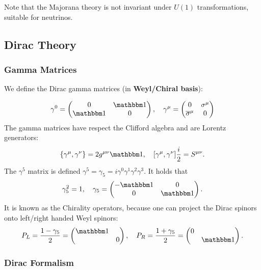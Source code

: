 \documentclass{article}
\begin{document}
Note that the Majorana theory is not invariant under $U(1)$ transformations, suitable for neutrinos.
\subsection{Dirac Theory}

\subsubsection{Gamma Matrices}

We define the Dirac gamma matrices (in \textbf{Weyl/Chiral basis}):

$$\gamma^0=\begin{pmatrix}0&\mathbbm 1\\\mathbbm 1&0\end{pmatrix},\quad\gamma^\mu=\begin{pmatrix}0&\sigma^\mu\\\overline\sigma^\mu&0\end{pmatrix}$$
The gamma matrices have respect the Clifford algebra and are Lorentz generators:
$$\acomm{\gamma^\mu}{\gamma^\nu}=2g^{\mu\nu}\mathbbm 1,\quad\comm{\gamma^\mu}{\gamma^\nu}\frac i2=S^{\mu\nu}.$$
The $\gamma^5$ matrix is defined $\gamma^5=\gamma_5=i\gamma^0\gamma^1\gamma^2\gamma^3$. It holds that 
\begin{equation}
    \gamma_5^2=1,\quad\gamma_5=\begin{pmatrix}-\mathbbm 1&0\\0&\mathbbm 1\end{pmatrix}.
\end{equation}
It is known as the Chirality operators, because one can project the Dirac spinors onto left/right handed Weyl spinors:
\begin{equation}
    P_L=\frac{1-\gamma_5}2=\begin{pmatrix}\mathbbm 1&\\&0\end{pmatrix},\quad P_R=\frac{1+\gamma_5}2=\begin{pmatrix}0&\\&\mathbbm 1\end{pmatrix}.
\end{equation}

\subsubsection{Dirac Formalism}
\end{document}
